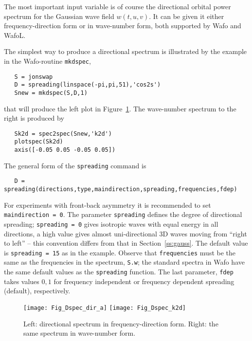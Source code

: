 The most important input variable is of course the directional orbital 
power spectrum for the Gaussian wave field $w(t,u,v)$.
 It can be given it either frequency-direction form or in wave-number
 form, both supported by  {\sc Wafo} and {\sc Wafo}L. 

The simplest way to produce a directional spectrum is illustrated by 
the example  in the {\sc Wafo}-routine {\tt mkdspec},
{\small\begin{verbatim}
   S = jonswap
   D = spreading(linspace(-pi,pi,51),'cos2s')
   Snew = mkdspec(S,D,1)
\end{verbatim}}
\noindent
that will produce the left plot in Figure~\ref{Dspec_dir}. The wave-number spectrum to the right is produced by
{\small\begin{verbatim}
   Sk2d = spec2spec(Snew,'k2d')
   plotspec(Sk2d)
   axis([-0.05 0.05 -0.05 0.05])
\end{verbatim}
}

The general form of the {\tt spreading} command is
{\small\begin{verbatim}
   D = spreading(directions,type,maindirection,spreading,frequencies,fdep)
\end{verbatim}
}
\noindent
For experiments with front-back asymmetry it is recommended to set {\tt maindirection = 0}. 
The parameter {\tt spreading} defines the degree of directional spreading; {\tt spreading = 0} 
gives isotropic waves with equal energy in all directions, a high value gives almost uni-directional 3D 
waves moving from ``right to left'' -- this convention differs from that in 
Section~\ref{ss:gauss}. \label{wavedirection}
The default value is {\tt spreading = 15} as in the example. Observe that {\tt frequencies} 
must be the same as the frequencies in the spectrum, {\tt S.w}; the standard spectra in 
{\sc Wafo} have the same default values as the {\tt spreading} function. The last 
parameter, {\tt fdep} takes values $0, 1$ for frequency independent or frequency 
dependent spreading (default), respectively. 
\begin{figure}[tbh]
\centerline{
\texttt{[image: Fig\_Dspec\_dir\_a]}
\hspace{5mm}
\texttt{[image: Fig\_Dspec\_k2d]}
}
\caption{Left: directional spectrum in frequency-direction form. Right: the same spectrum in wave-number form.}
\label{Dspec_dir}
\end{figure}

